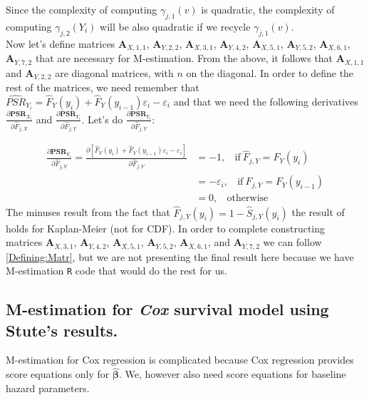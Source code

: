 \documentclass[]{article}
\let\epsilon\varepsilon
\begin{document}
Since the complexity of computing $\gamma_{j,1}(v)$ is quadratic, the complexity of computing $\gamma_{j,2}(Y_i)$ will be also quadratic if we recycle $\gamma_{j,1}(v)$.\\

Now let's define matrices $\pmb{A}_{X,1,1}$, $\pmb{A}_{Y,2,2}$, $\pmb{A}_{X,3,1}$, $\pmb{A}_{Y, 4,2}$,  $\pmb{A}_{X,5,1}$, $\pmb{A}_{Y,5,2}$, $\pmb{A}_{X,6,1}$, $\pmb{A}_{Y, 7,2}$ that are necessary for M-estimation.  From the above, it follows that $\pmb{A}_{X,1,1}$ and $\pmb{A}_{Y,2,2}$ are diagonal matrices, with $n$ on the diagonal. In order to define the rest of the matrices, we need remember that $\widehat{PSR}_{Y_i} = \hat{F}_Y(y_i) + \hat{F}_Y(y_{i-1})\epsilon_i - \epsilon_i$ and that we need the following derivatives $\frac{\partial \pmb{PSR}_{X_i}}{\partial \hat{F}_{j,X}}$ and $\frac{\partial \pmb{PSR}_{Y_i}}{\partial \hat{F}_{j,Y}}$. Let's do $\frac{\partial \pmb{PSR}_{Y_i}}{\partial \hat{F}_{j,Y}}$:

$$
  \begin{aligned}
    \frac{\partial \pmb{PSR}_{Y_i}}{\partial \hat{F}_{j,Y}} = \frac{\partial \left[  \hat{F}_Y(y_i) + \hat{F}_Y(y_{i-1})\epsilon_i - \epsilon_i  \right]}{\partial \hat{F}_{j,Y}} &= -1,~~~~\text{if}~\hat{F}_{j,Y} = F_Y(y_i)\\
    &=-\epsilon_i,~~~~\text{if}~\hat{F}_{j,Y} = F_Y(y_{i-1})\\ 
    &=0,~~~~\text{otherwise}
  \end{aligned}
$$
The minuses result from the fact that $\hat{F}_{j,Y}(y_i) = 1- \hat{S}_{j,Y}(y_i)$ the result of \cite{stute1995central} holds for Kaplan-Meier (not for CDF).
In order to complete constructing matrices $\pmb{A}_{X,3,1}$, $\pmb{A}_{Y, 4,2}$,  $\pmb{A}_{X,5,1}$, $\pmb{A}_{Y,5,2}$, $\pmb{A}_{X,6,1}$, and $\pmb{A}_{Y, 7,2}$  we can follow \ref{Defining:Matr}, but we are not presenting the final result here because we have M-estimation \texttt{R} code that would do the rest for us.

\subsection{M-estimation for \emph{Cox} survival model  using Stute's results.}
M-estimation for Cox regression is complicated because Cox regression provides score equations only for $\hat{\pmb{\beta}}$. We, however also need score equations for baseline hazard parameters. \\
\end{document}

